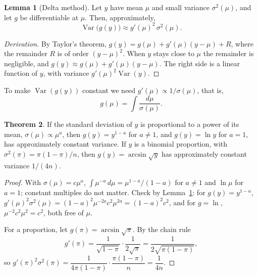 \documentclass[11pt,a4paper]{article}
\numberwithin{equation}{section}
\theoremstyle{definition}
\newtheorem{thm}{Theorem}[subsection]
\newtheorem{lem}[thm]{Lemma}
\begin{document}
\begin{lem}[Delta method]\label{lem:delta}
Let $y$ have mean $\mu$ and small variance $\sigma^2(\mu)$, and let $g$ be differentiable at
$\mu$. Then, approximately,
\[
\operatorname{Var}\bigl(g(y)\bigr) \approx g'(\mu)^2\,\sigma^2(\mu) .
\]
\end{lem}

\begin{proof}[Derivation]
By Taylor's theorem, $g(y) = g(\mu) + g'(\mu)(y - \mu) + R$, where the remainder $R$ is of
order $(y - \mu)^2$. When $y$ stays close to $\mu$ the remainder is negligible, and
$g(y) \approx g(\mu) + g'(\mu)(y - \mu)$. The right side is a linear function of $y$, with
variance $g'(\mu)^2\operatorname{Var}(y)$.
\end{proof}

To make $\operatorname{Var}(g(y))$ constant we need $g'(\mu) \propto 1/\sigma(\mu)$, that is,
\[
g(\mu) = \int \frac{d\mu}{\sigma(\mu)} .
\]

\begin{thm}\label{thm:stabilize}
If the standard deviation of $y$ is proportional to a power of its mean, $\sigma(\mu) \propto \mu^a$,
then $g(y) = y^{1 - a}$ for $a \neq 1$, and $g(y) = \ln y$ for $a = 1$, has approximately constant
variance. If $y$ is a binomial proportion, with $\sigma^2(\pi) = \pi(1 - \pi)/n$, then
$g(y) = \arcsin\sqrt{y}$ has approximately constant variance $1/(4n)$.
\end{thm}

\begin{proof}
With $\sigma(\mu) = c\mu^a$, $\int \mu^{-a}\,d\mu = \mu^{1 - a}/(1 - a)$ for $a \neq 1$ and
$\ln\mu$ for $a = 1$; constant multiples do not matter. Check by Lemma~\ref{lem:delta}: for
$g(y) = y^{1-a}$, $g'(\mu)^2\sigma^2(\mu) = (1 - a)^2\mu^{-2a}c^2\mu^{2a} = (1 - a)^2c^2$, and for
$g = \ln$, $\mu^{-2}c^2\mu^2 = c^2$, both free of $\mu$.

For a proportion, let $g(\pi) = \arcsin\sqrt\pi$. By the chain rule
\[
g'(\pi) = \frac{1}{\sqrt{1 - \pi}}\cdot\frac{1}{2\sqrt\pi} = \frac{1}{2\sqrt{\pi(1 - \pi)}} ,
\]
so $g'(\pi)^2\sigma^2(\pi) = \dfrac{1}{4\pi(1 - \pi)}\cdot\dfrac{\pi(1 - \pi)}{n} = \dfrac{1}{4n}$.
\end{proof}
\end{document}
